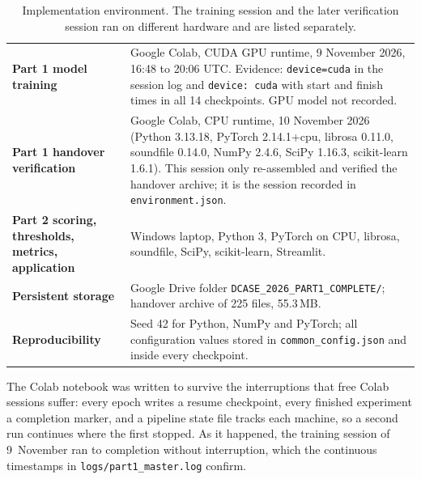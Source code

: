\begin{table}[!htb]\centering\footnotesize\renewcommand{\arraystretch}{1.3}
\begin{tabular}{@{}p{}p{}@{}}\toprule
\textbf{Part 1 model training} & Google Colab, CUDA GPU runtime, 9 November 2026, 16:48 to 20:06 UTC. Evidence: \texttt{device=cuda} in the session log and \texttt{device: cuda} with start and finish times in all 14 checkpoints. GPU model not recorded. \\
\textbf{Part 1 handover verification} & Google Colab, CPU runtime, 10 November 2026 (Python 3.13.18, PyTorch 2.14.1+cpu, librosa 0.11.0, soundfile 0.14.0, NumPy 2.4.6, SciPy 1.16.3, scikit-learn 1.6.1). This session only re-assembled and verified the handover archive; it is the session recorded in \texttt{environment.json}. \\
\textbf{Part 2 scoring, thresholds, metrics, application} & Windows laptop, Python 3, PyTorch on CPU, librosa, soundfile, SciPy, scikit-learn, Streamlit. \\
\textbf{Persistent storage} & Google Drive folder \texttt{DCASE\_2026\_PART1\_COMPLETE/}; handover archive of 225 files, 55.3\,MB. \\
\textbf{Reproducibility} & Seed 42 for Python, NumPy and PyTorch; all configuration values stored in \texttt{common\_config.json} and inside every checkpoint. \\
\bottomrule\end{tabular}
\caption{Implementation environment. The training session and the later verification session ran on different hardware and are listed separately.}
\label{tab:env}
\end{table}

The Colab notebook was written to survive the interruptions that free Colab sessions suffer: every epoch writes a resume checkpoint, every finished experiment a completion marker, and a pipeline state file tracks each machine, so a second run continues where the first stopped. As it happened, the training session of 9~November ran to completion without interruption, which the continuous timestamps in \texttt{logs/part1\_master.log} confirm.
